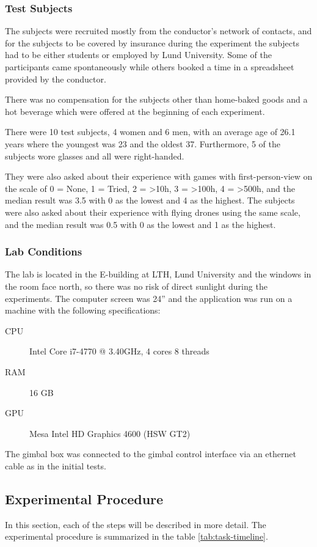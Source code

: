 \documentclass[nofilelist]{cslthse-msc}
\begin{document}
\subsubsection{Test Subjects}
The subjects were recruited mostly from the conductor's network of contacts, and for the subjects to be covered by insurance during the experiment the subjects had to be either students or employed by Lund University. Some of the participants came spontaneously while others booked a time in a spreadsheet provided by the conductor.

There was no compensation for the subjects other than home-baked goods and a hot beverage which were offered at the beginning of each experiment.

There were 10 test subjects, 4 women and 6 men, with an average age of 26.1 years where the youngest was 23 and the oldest 37. Furthermore, 5 of the subjects wore glasses and all were right-handed. 

They were also asked about their experience with games with first-person-view on the scale of 0 = None, 1 = Tried, 2 = >10h, 3 = >100h, 4 = >500h, and the median result was 3.5 with 0 as the lowest and 4 as the highest. The subjects were also asked about their experience with flying drones using the same scale, and the median result was 0.5 with 0 as the lowest and 1 as the highest. 

\subsubsection{Lab Conditions}
The lab is located in the E-building at LTH, Lund University and the windows in the room face north, so there was no risk of direct sunlight during the experiments. The computer screen was 24'' and the application was run on a machine with the following specifications:
\begin{description}
   \item[CPU] Intel Core i7-4770 @ 3.40GHz, 4 cores 8 threads
   \item[RAM] 16 GB
   \item[GPU] Mesa Intel HD Graphics 4600 (HSW GT2)
\end{description}

The gimbal box was connected to the gimbal control interface via an ethernet cable as in the initial tests.

\subsection{Experimental Procedure}
In this section, each of the steps will be described in more detail. The experimental procedure is summarized in the table \ref{tab:task-timeline}.
\end{document}
